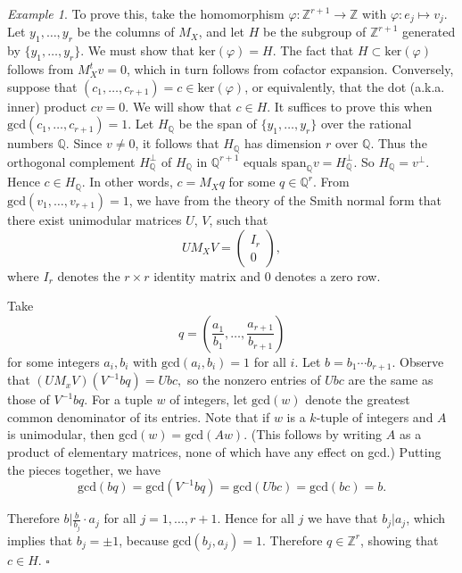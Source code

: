\documentclass{article}
\renewcommand{\phi}{\varphi}
\theoremstyle{definition}
\theoremstyle{remark}
\newtheorem{Ex}[Thm]{Example}
\begin{document}
\begin{Ex}
To prove this, take the homomorphism $\phi\colon\mathbb{Z}^{r+1}\to \mathbb{Z}$ with $\phi\colon e_j\mapsto v_j$.  Let $y_1,\dots,y_r$ be the columns of $M_X$, and let $H$ be the subgroup of $\mathbb{Z}^{r+1}$ generated by $\{y_1,\dots,y_r\}$.  We must show that $\text{ker}(\phi)=H$.  The fact that $H\subset \text{ker}(\phi)$ follows from $M_X^tv=0$, which in turn follows from cofactor expansion.  Conversely, suppose that $(c_1,\dots,c_{r+1})=c\in \text{ker}(\phi)$, or equivalently, that the dot (a.k.a. inner) product $cv=0$.  We will show that $c\in H$.  It suffices to prove this when $\text{gcd}(c_1,\dots,c_{r+1})=1$.  Let $H_\mathbb{Q}$ be the span of $\{y_1,\dots,y_r\}$ over the rational numbers $\mathbb{Q}$.  Since $v\neq 0$, it follows that $H_\mathbb{Q}$ has dimension $r$ over $\mathbb{Q}$.  Thus the orthogonal complement $H_\mathbb{Q}^\perp$ of $H_\mathbb{Q}$ in $\mathbb{Q}^{r+1}$ equals $\text{span}_\mathbb{Q} v= H_\mathbb{Q}^\perp$.  So $H_\mathbb{Q}=v^\perp$.  Hence $c\in H_\mathbb{Q}$.  In other words, $c=M_X q$ for some $q\in\mathbb{Q}^r$.  From $\text{gcd}(v_1,\dots,v_{r+1})=1$, we have from the theory of the Smith normal form \cite{Dummit_Foote_2004} that there exist unimodular matrices $U$, $V$, such that \[UM_X V=\begin{pmatrix}
I_r\\
0
\end{pmatrix},\] where $I_r$ denotes the $r\times r$ identity matrix and $0$ denotes a zero row.  

Take \[q=\left(\frac{a_1}{b_1},\dots,\frac{a_{r+1}}{b_{r+1}}\right)\]for some integers $a_i, b_i$ with $\text{gcd}(a_i,b_i)=1$ for all $i$.  Let $b=b_1\cdots b_{r+1}$.  Observe that $(UM_x V)(V^{-1} bq) = Ubc,$ so the nonzero entries of $Ubc$ are the same as those of $V^{-1} bq$.   For a tuple $w$ of integers, let $\text{gcd}(w)$ denote the greatest common denominator of its entries.  Note that if $w$ is a $k$-tuple of integers and $A$ is unimodular, then $\text{gcd}(w)=\text{gcd}(Aw)$.  (This follows by writing $A$ as a product of elementary matrices, none of which have any effect on gcd.)  Putting the pieces together, we have \[\text{gcd}(bq)=\text{gcd}(V^{-1}bq)=\text{gcd}(Ubc)=\text{gcd}(bc)=b.\]

Therefore $b|\frac{b}{b_j}\cdot a_j$ for all $j=1,\dots,r+1$.  Hence for all $j$ we have that $b_j|a_j$, which implies that $b_j=\pm 1$, because $\text{gcd}(b_j,a_j)=1$.  Therefore $q\in\mathbb{Z}^r$, showing that $c\in H$.  \hfill$\square$
\end{Ex}
\end{document}
